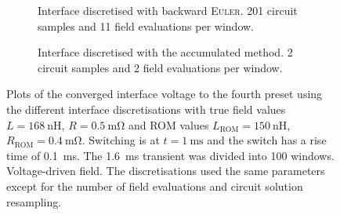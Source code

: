 \begin{figure}
  \centering
  \begin{subfigure}[b]{0.7\textwidth}
    \centering
    
    \caption{Interface discretised with backward \textsc{Euler}. 201 circuit samples and 11 field evaluations per window.}
    \label{fig:example-3-plot-voltage}
  \end{subfigure}

  \vspace{1em}

  \begin{subfigure}[b]{0.7\textwidth}
    \centering
    
    \caption{Interface discretised with the accumulated method. 2 circuit samples and 2 field evaluations per window.}
    \label{fig:example-3-plot-voltage-acc}
  \end{subfigure}
  \caption{Plots of the converged interface voltage to the fourth preset using the different interface discretisations with true field values $L=\qty{168}{\nano\henry}$, $R=\qty{0.5}{\milli\ohm}$ and ROM values $L_{\text{ROM}}=\qty{150}{\nano\henry}$, $R_{\text{ROM}}=\qty{0.4}{\milli\ohm}$. Switching is at $t=\qty{1}{\milli\second}$ and the switch has a rise time of \qty{0.1}{\milli\second}. The \qty{1.6}{\milli\second} transient was divided into 100 windows. Voltage-driven field. The discretisations used the same parameters except for the number of field evaluations and circuit solution resampling.}
  \label{fig:example-3-plots}
\end{figure}


